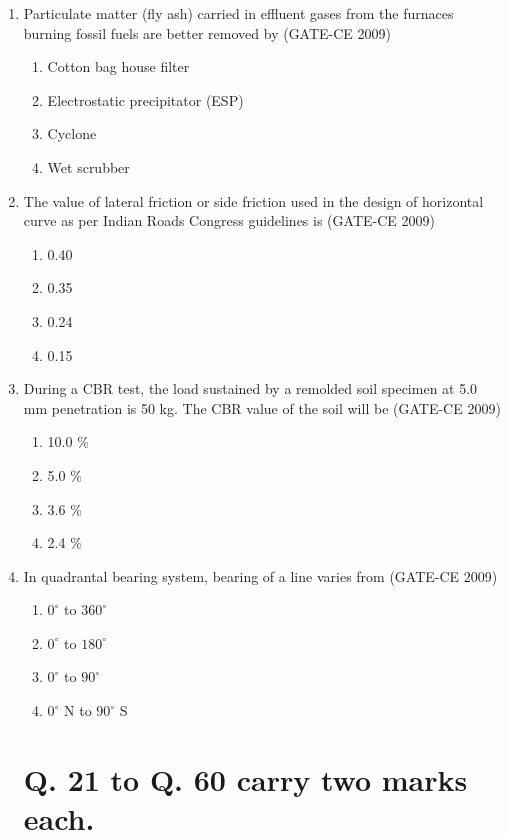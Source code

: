 \documentclass[journal,12pt,onecolumn]{article}
\theoremstyle{remark}
\begin{document}
\begin{enumerate}
    \item Particulate matter (fly ash) carried in effluent gases from the furnaces burning fossil fuels are better removed by (GATE-CE 2009)
    \begin{enumerate}
        \item Cotton bag house filter 
        \item Electrostatic precipitator (ESP)
        \item Cyclone 
        \item Wet scrubber
    \end{enumerate}
    
    \item The value of lateral friction or side friction used in the design of horizontal curve as per Indian Roads Congress guidelines is (GATE-CE 2009)
    \begin{enumerate}
        \item 0.40 
        \item 0.35 
        \item 0.24 
        \item 0.15
    \end{enumerate}
    
    \item During a CBR test, the load sustained by a remolded soil specimen at 5.0 mm penetration is 50 kg. The CBR value of the soil will be (GATE-CE 2009)
    \begin{enumerate}
        \item 10.0 \% 
        \item 5.0 \% 
        \item 3.6 \% 
        \item 2.4 \%
    \end{enumerate}
    
    \item In quadrantal bearing system, bearing of a line varies from (GATE-CE 2009)
    \begin{enumerate}
        \item $0^\circ$ to $360^\circ$ 
        \item $0^\circ$ to $180^\circ$
        \item $0^\circ$ to $90^\circ$ 
        \item $0^\circ$ N to $90^\circ$ S
    \end{enumerate}

\section*{Q. 21 to Q. 60 carry two marks each.}


\end{enumerate}
\end{document}

